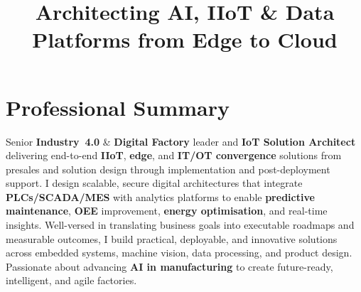 \documentclass[11pt,a4paper,sans]{moderncv} %
\title{Architecting AI, IIoT \& Data Platforms from Edge to Cloud}
\newcommand{\kw}[1]{\textbf{#1}}
\begin{document}
\makecvtitle
\vspace*{-1.5\baselineskip} %

\section{Professional Summary}
\begin{justify}
Senior \kw{Industry~4.0} \& \kw{Digital Factory} leader and \kw{IoT Solution Architect} delivering end-to-end \kw{IIoT}, \kw{edge}, and \kw{IT/OT convergence} solutions from presales and solution design through implementation and post-deployment support. I design scalable, secure digital architectures that integrate \kw{PLCs/SCADA/MES} with analytics platforms to enable \kw{predictive maintenance}, \kw{OEE} improvement, \kw{energy optimisation}, and real-time insights. Well-versed in translating business goals into executable roadmaps and measurable outcomes, I build practical, deployable, and innovative solutions across embedded systems, machine vision, data processing, and product design. Passionate about advancing \kw{AI in manufacturing} to create future-ready, intelligent, and agile factories.
\end{justify}

\end{document}
